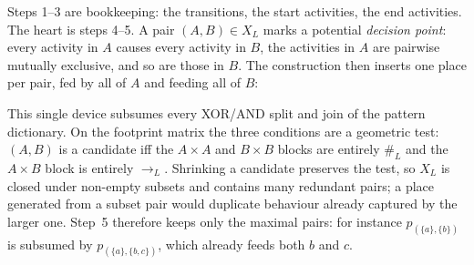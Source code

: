 Steps 1--3 are bookkeeping: the transitions, the start activities, the end activities. The heart is steps 4--5. A pair $(A, B) \in X_L$ marks a potential \emph{decision point}: every activity in $A$ causes every activity in $B$, the activities in $A$ are pairwise mutually exclusive, and so are those in $B$. The construction then inserts one place per pair, fed by all of $A$ and feeding all of $B$:
\begin{center}
\end{center}
This single device subsumes every XOR/AND split and join of the pattern dictionary. On the footprint matrix the three conditions are a geometric test: $(A, B)$ is a candidate iff the $A \times A$ and $B \times B$ blocks are entirely $\#_L$ and the $A \times B$ block is entirely $\to_L$. Shrinking a candidate preserves the test, so $X_L$ is closed under non-empty subsets and contains many redundant pairs; a place generated from a subset pair would duplicate behaviour already captured by the larger one. Step~5 therefore keeps only the maximal pairs: for instance $p_{(\{a\}, \{b\})}$ is subsumed by $p_{(\{a\}, \{b, c\})}$, which already feeds both $b$ and $c$.

